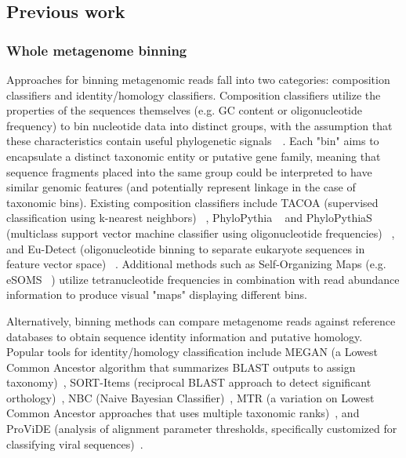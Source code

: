 \documentclass[10pt]{article}
\begin{document}
\subsection*{Previous work}

\subsubsection*{Whole metagenome binning}
Approaches for binning metagenomic reads fall into two categories: composition classifiers and identity/homology classifiers. 
Composition classifiers utilize the properties of the sequences themselves (e.g. GC content or oligonucleotide frequency) to bin nucleotide data into distinct groups, with the assumption that these characteristics contain useful phylogenetic signals~\cite{Campbell1999}~\cite{Karlin1997}. 
Each "bin" aims to encapsulate a distinct taxonomic entity or putative gene family, meaning that sequence fragments placed into the same group could be interpreted to have similar genomic features (and potentially represent linkage in the case of taxonomic bins). 
Existing composition classifiers include TACOA (supervised classification using k-nearest neighbors) ~\cite{Diaz2009}, PhyloPythia  ~\cite{Mchardy2006} and PhyloPythiaS (multiclass support vector machine classifier using oligonucleotide frequencies) ~\cite{Patil2011}, and Eu-Detect (oligonucleotide binning to separate eukaryote sequences in feature vector space) ~\cite{Mohammed2011}. 
Additional methods such as Self-Organizing Maps (e.g. eSOMS ~\cite {Dick2009}) utilize tetranucleotide frequencies in combination with read abundance information to produce visual "maps" displaying different bins. 

Alternatively, binning methods can compare metagenome reads against reference databases to obtain sequence identity information and putative homology. 
Popular tools for identity/homology classification include MEGAN (a Lowest Common Ancestor algorithm that summarizes BLAST outputs to assign taxonomy)~\cite{Huson2007}, SORT-Items (reciprocal BLAST approach to detect significant orthology)~\cite{Haque2009}, NBC (Naive Bayesian Classifier)~\cite{Rosen2011}, MTR (a variation on Lowest Common Ancestor approaches that uses multiple taxonomic ranks)~\cite{Gori2011}, and ProViDE (analysis of alignment parameter thresholds, specifically customized for classifying viral sequences)~\cite{Ghosh2011}.
\end{document}

